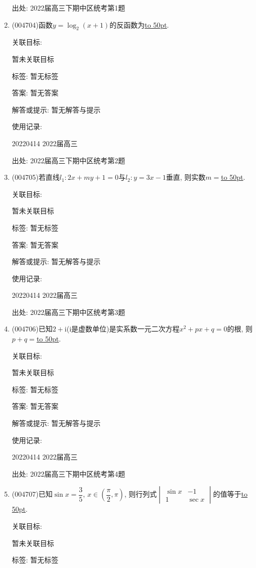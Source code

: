 \documentclass[10pt,a4paper]{article}
\newcommand{\blank}[1]{\underline{\hbox to #1pt{}}}
\begin{document}
\begin{enumerate}[1.]
出处: 2022届高三下期中区统考第1题
\item { (004704)}函数$y=\log_2(x+1)$的反函数为\blank{50}.


关联目标:

暂未关联目标



标签: 暂无标签

答案: 暂无答案

解答或提示: 暂无解答与提示

使用记录:

20220414	2022届高三	


出处: 2022届高三下期中区统考第2题
\item { (004705)}若直线$l_1:2x+my+1=0$与$l_2:y=3x-1$垂直, 则实数$m=$\blank{50}.


关联目标:

暂未关联目标



标签: 暂无标签

答案: 暂无答案

解答或提示: 暂无解答与提示

使用记录:

20220414	2022届高三	


出处: 2022届高三下期中区统考第3题
\item { (004706)}已知$2+\mathrm{i}$($\mathrm{i}$是虚数单位)是实系数一元二次方程$x^2+px+q=0$的根, 则$p+q=$\blank{50}.


关联目标:

暂未关联目标



标签: 暂无标签

答案: 暂无答案

解答或提示: 暂无解答与提示

使用记录:

20220414	2022届高三	


出处: 2022届高三下期中区统考第4题
\item { (004707)}已知$\sin x=\dfrac{3}{5}$, $x\in (\dfrac \pi 2,\pi)$, 则行列式$\begin{vmatrix}   \sin x & -1 \\ 1 & \sec x \end{vmatrix}$的值等于\blank{50}.


关联目标:

暂未关联目标



标签: 暂无标签


\end{enumerate}
\end{document}
